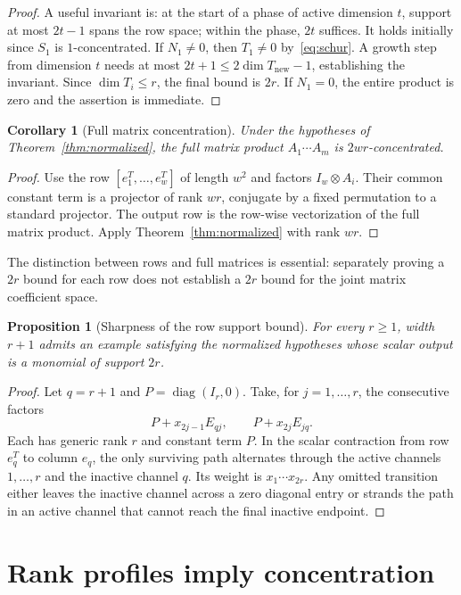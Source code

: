 \documentclass[11pt]{article}
\newtheorem{corollary}[theorem]{Corollary}
\newtheorem{proposition}[theorem]{Proposition}
\theoremstyle{definition}\newtheorem{definition}[theorem]{Definition}
\theoremstyle{remark}\newtheorem{remark}[theorem]{Remark}
\begin{document}
\begin{proof}
A useful invariant is: at the start of a phase of active dimension $t$,
support at most $2t-1$ spans the row space; within the phase, $2t$ suffices.
It holds initially since $S_1$ is $1$-concentrated. If $N_1\ne0$, then
$T_1\ne0$ by~\eqref{eq:schur}. A growth step from dimension $t$ needs at
most $2t+1\le2\dim T_{\mathrm{new}}-1$, establishing the invariant.
Since $\dim T_i\le r$, the final bound is $2r$. If $N_1=0$, the entire
product is zero and the assertion is immediate.
\end{proof}

\begin{corollary}[Full matrix concentration]\label{cor:matrix}
Under the hypotheses of Theorem~\ref{thm:normalized}, the full matrix
product $A_1\cdots A_m$ is $2wr$-concentrated.
\end{corollary}
\begin{proof}
Use the row $[e_1^T,\ldots,e_w^T]$ of length $w^2$ and factors
$I_w\otimes A_i$. Their common constant term is a projector of rank $wr$,
conjugate by a fixed permutation to a standard projector. The output row
is the row-wise vectorization of the full matrix product. Apply
Theorem~\ref{thm:normalized} with rank $wr$.
\end{proof}

The distinction between rows and full matrices is essential: separately
proving a $2r$ bound for each row does not establish a $2r$ bound for the
joint matrix coefficient space.

\begin{proposition}[Sharpness of the row support bound]
For every $r\ge1$, width $r+1$ admits an example satisfying the normalized
hypotheses whose scalar output is a monomial of support $2r$.
\end{proposition}
\begin{proof}
Let $q=r+1$ and $P=\operatorname{diag}(I_r,0)$. Take, for $j=1,\ldots,r$,
the consecutive factors
\[
 P+x_{2j-1}E_{qj},\qquad P+x_{2j}E_{jq}.
\]
Each has generic rank $r$ and constant term $P$. In the scalar contraction
from row $e_q^T$ to column $e_q$, the only surviving path alternates through
the active channels $1,\ldots,r$ and the inactive channel $q$. Its weight
is $x_1\cdots x_{2r}$. Any omitted transition either leaves the inactive
channel across a zero diagonal entry or strands the path in an active
channel that cannot reach the final inactive endpoint.
\end{proof}

\section{Rank profiles imply concentration}
\end{document}
